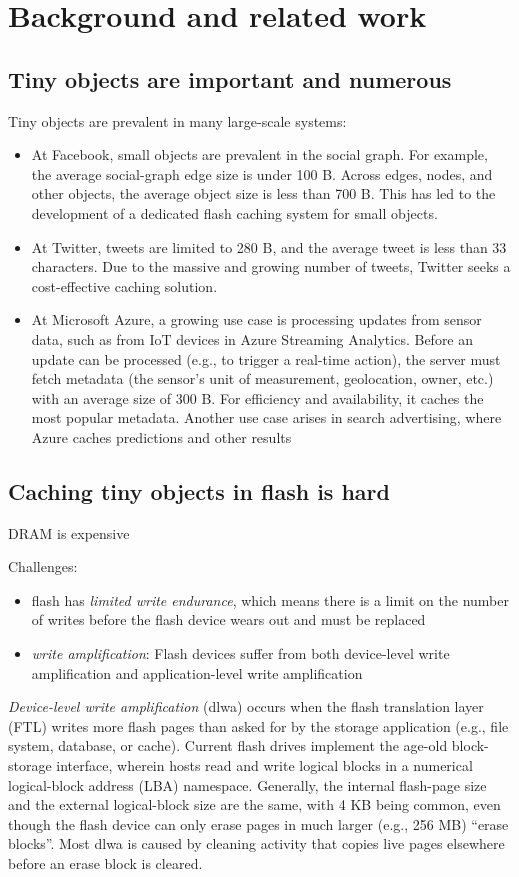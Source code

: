 \documentclass[11pt]{article}
\begin{document}
\section{Background and related work}
\label{sec:org647be46}
\subsection{Tiny objects are important and numerous}
\label{sec:orgc56e317}
Tiny objects are prevalent in many large-scale systems:
\begin{itemize}
\item At Facebook, small objects are prevalent in the social graph. For example, the average social-graph
edge size is under 100 B. Across edges, nodes, and other objects, the average object size is less
than 700 B. This has led to the development of a dedicated flash caching system for small objects.
\item At Twitter, tweets are limited to 280 B, and the average tweet is less than 33 characters. Due to
the massive and growing number of tweets, Twitter seeks a cost-effective caching solution.
\item At Microsoft Azure, a growing use case is processing updates from sensor data, such as from IoT
devices in Azure Streaming Analytics. Before an update can be processed (e.g., to trigger a
real-time action), the server must fetch metadata (the sensor’s unit of measurement, geolocation,
owner, etc.) with an average size of 300 B. For efficiency and availability, it caches the most
popular metadata. Another use case arises in search advertising, where Azure caches predictions and
other results
\end{itemize}
\subsection{Caching tiny objects in flash is hard}
\label{sec:orge3a66a2}
DRAM is expensive

Challenges:
\begin{itemize}
\item flash has \emph{limited write endurance}, which means there is a limit on the number of writes before the
flash device wears out and must be replaced
\item \emph{write amplification}: Flash devices suffer from both device-level write amplification and
application-level write amplification
\end{itemize}

\emph{Device-level write amplification} (dlwa) occurs when the flash translation layer (FTL) writes more
flash pages than asked for by the storage application (e.g., file system, database, or cache). Current
flash drives implement the age-old block-storage interface, wherein hosts read and write logical
blocks in a numerical logical-block address (LBA) namespace. Generally, the internal flash-page size
and the external logical-block size are the same, with 4 KB being common, even though the flash device
can only erase pages in much larger (e.g., 256 MB) “erase blocks”. Most dlwa is caused by cleaning
activity that copies live pages elsewhere before an erase block is cleared.
\end{document}

